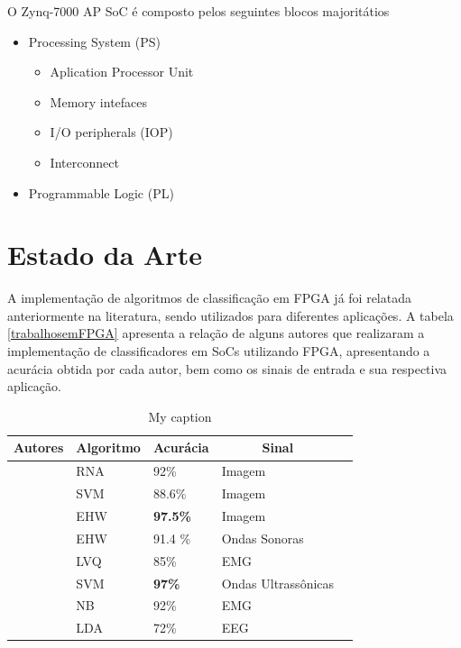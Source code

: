 O Zynq-7000 AP SoC é composto pelos seguintes blocos majoritátios
\begin{itemize}
\item Processing System (PS)
\begin{itemize}
\item Aplication Processor Unit
\item Memory intefaces
\item I/O peripherals (IOP)
\item Interconnect
\end{itemize}
\item Programmable Logic (PL)
\end{itemize}
\section{Estado da Arte}
A implementação de algoritmos de classificação em FPGA já foi relatada anteriormente na literatura, sendo utilizados para diferentes aplicações. A tabela \ref{trabalhosemFPGA} apresenta a relação de alguns autores que realizaram a implementação de classificadores em SoCs utilizando FPGA, apresentando a acurácia obtida por cada autor, bem como os sinais de entrada e sua respectiva aplicação.

\begin{table}[h!]
	\centering
	\caption{My caption}
	\label{my-label}
	\begin{tabular}{|l|l|l|l|l|}
		\hline
		\multicolumn{1}{|c|}{\textbf{Autores}} & \multicolumn{1}{c|}{\textbf{Algoritmo}} &  \multicolumn{1}{c|}{\textbf{Acurácia}} & \multicolumn{1}{c|}{\textbf{Sinal}} \\ \hline
		\textit{\cite{RNAFPGA}} & RNA & 92\% & Imagem \\ \hline
		\textit{\cite{Irick}} & SVM  & 88.6\% & Imagem \\ \hline
		\textit{\cite{Glette2009}} & EHW  & \textbf{97.5\%} & Imagem \\ \hline
		\textit{\cite{Glette2007}} & EHW & 91.4 \% & Ondas Sonoras \\ \hline
		\textit{\cite{Alkim}} & LVQ & 85\% & EMG \\ \hline
		\textit{\cite{Yuan}} & SVM & \textbf{97\%} & Ondas Ultrassônicas \\ \hline
		\textit{\cite{Chen}} & NB & 92\% & EMG \\ \hline
		\textit{\cite{Kais}} & LDA & 72\% & EEG \\ \hline
	\end{tabular}
\end{table}

